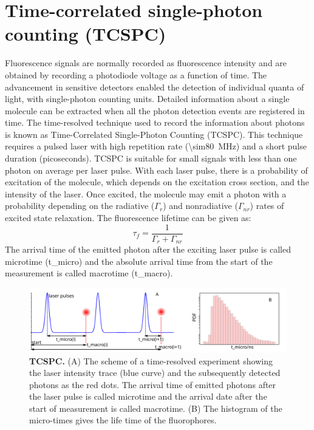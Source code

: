 \section{Time-correlated single-photon counting (TCSPC)}
Fluorescence signals are normally recorded as fluorescence intensity and are obtained by recording a photodiode voltage as a function of time.
The advancement in sensitive detectors enabled the detection of individual quanta of light, with single-photon counting units.
Detailed information about a single molecule can be extracted when all the photon detection events are registered in time.
The time-resolved technique used to record the information about photons is known as Time-Correlated Single-Photon Counting (TCSPC).\cite{oconnor2012timecorrelated,birch2002topics}
This technique requires a pulsed laser with high repetition rate (\SI{\sim80}{\MHz}) and a short pulse duration (picoseconds).
TCSPC is suitable for small signals with less than one photon on average per laser pulse.
With each laser pulse, there is a probability of excitation of the molecule, which depends on the excitation cross section, and the intensity of the laser.
Once excited, the molecule may emit a photon with a probability depending on the radiative ($\Gamma_{r}$) and nonradiative ($\Gamma_{nr}$) rates of excited state relaxation.
The fluorescence lifetime can be given as:
\begin{equation}
	\tau_f = \frac{1}{\Gamma_{r} + \Gamma_{nr}}
\end{equation}
The arrival time of the emitted photon after the exciting laser pulse is called microtime (t\_micro) and the absolute arrival time from the start of the measurement is called macrotime (t\_macro).
\begin{figure}
	\centering
	\includegraphics[width=\textwidth]{tcspc_sch}
	\caption{\textbf{TCSPC.} (A) The scheme of a time-resolved experiment showing the laser intensity trace (blue curve) and the subsequently detected photons as the red dots.
	The arrival time of emitted photons after the laser pulse is called microtime and the arrival date after the start of measurement is called macrotime.
	(B) The histogram of the micro-times gives the life time of the fluorophores.}
	\label{fig:tcspc_sch}
\end{figure}
